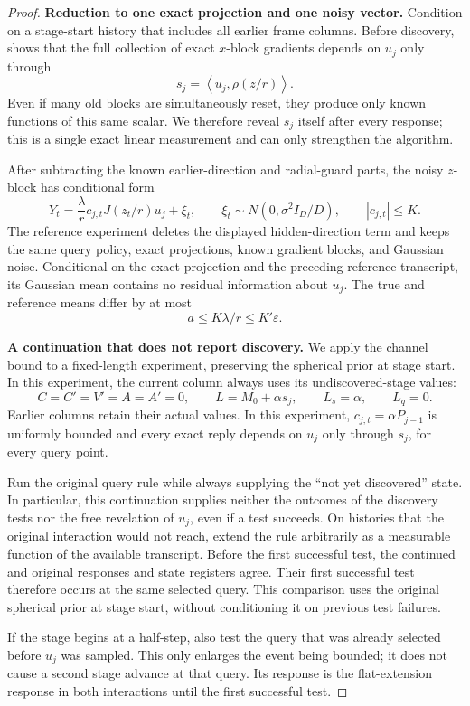 \documentclass[11pt]{article}
\newcommand{\ip}[2]{\left\langle #1,#2\right\rangle}
\newcommand{\eps}{\varepsilon}
\theoremstyle{definition}
\theoremstyle{remark}
\begin{document}
\begin{proof}
\noindent\textbf{Reduction to one exact projection and one noisy vector.}
Condition on a stage-start history that includes all earlier frame columns.  Before discovery,  shows that the full
collection of exact $x$-block gradients depends on $u_j$ only through
\[
 s_j=\ip{u_j}{\rho(z/r)}.
\]
Even if many old blocks are simultaneously reset, they produce only known
functions of this same scalar.  We therefore reveal $s_j$ itself after every
response; this is a single exact linear measurement and can only strengthen
the algorithm.

After subtracting the known earlier-direction and radial-guard parts, the
noisy $z$-block has conditional form
\[
 Y_t=\frac{\lambda}{r}c_{j,t}J(z_t/r)u_j+\xi_t,
 \qquad
 \xi_t\sim N(0,\sigma^2I_D/D),
 \qquad |c_{j,t}|\le K.
\]
The reference experiment deletes the displayed hidden-direction term and
keeps the same query policy, exact projections, known gradient blocks, and
Gaussian noise.  Conditional on the exact projection and the preceding
reference transcript, its Gaussian mean contains no residual information
about $u_j$.  The true and reference means differ by at most
\[
 a\le K\lambda/r\le K'\eps.
\]

\noindent\textbf{A continuation that does not report discovery.}
We apply the channel bound to a fixed-length experiment, preserving the
spherical prior at stage start.  In this experiment, the current column always
uses its undiscovered-stage values:
\[
 C=C'=V'=A=A'=0,\qquad
 L=M_0+\alpha s_j,\qquad L_s=\alpha,\qquad L_q=0.
\]
Earlier columns retain their actual values.  In this experiment,
$c_{j,t}=\alpha P_{j-1}$ is uniformly bounded and every exact reply depends
on $u_j$ only through $s_j$, for every query point.

Run the original query rule while always supplying the ``not yet discovered''
state.  In particular, this continuation supplies neither the outcomes of the
discovery tests nor the free revelation of $u_j$, even if a test succeeds.
On histories that the original interaction would not reach, extend the rule
arbitrarily as a measurable function of the available transcript.  Before the
first successful test, the continued and original responses and state
registers agree.  Their first successful test therefore occurs at the same
selected query.  This comparison uses the original spherical prior at stage
start, without conditioning it on previous test failures.

If the stage begins at a half-step, also test the query that was already
selected before $u_j$ was sampled.  This only enlarges the event being bounded;
it does not cause a second stage advance at that query.  Its response is the
flat-extension response in both interactions until the first successful test.


\end{proof}
\end{document}
